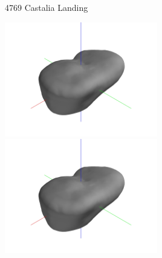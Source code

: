 \begin{frame}{4769 Castalia Landing}

\begin{center}
    \href{https://youtu.be/57sGEJRwfH4}{\includegraphics[trim={20cm 10cm 20cm 10cm},clip,keepaspectratio,width=0.5\textwidth,height=\textheight]{figures/dynamic_exploration/castalia/partial_14998.jpg}}%
    \href{https://youtu.be/8igpoKcwqXs}{\includegraphics[trim={20cm 10cm 20cm 10cm},clip,keepaspectratio,width=0.5\textwidth,height=\textheight]{figures/dynamic_exploration/castalia/partial_14998.jpg}}
\end{center}

\end{frame}

